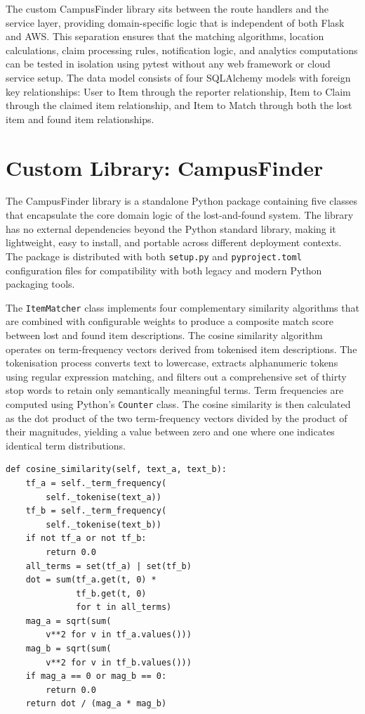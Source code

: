 \documentclass[conference]{IEEEtran}
\begin{document}
The custom CampusFinder library sits between the route handlers and the service layer, providing domain-specific logic that is independent of both Flask and AWS. This separation ensures that the matching algorithms, location calculations, claim processing rules, notification logic, and analytics computations can be tested in isolation using pytest without any web framework or cloud service setup. The data model consists of four SQLAlchemy models with foreign key relationships: User to Item through the reporter relationship, Item to Claim through the claimed item relationship, and Item to Match through both the lost item and found item relationships.

\section{Custom Library: CampusFinder}

The CampusFinder library is a standalone Python package containing five classes that encapsulate the core domain logic of the lost-and-found system. The library has no external dependencies beyond the Python standard library, making it lightweight, easy to install, and portable across different deployment contexts. The package is distributed with both \texttt{setup.py} and \texttt{pyproject.toml} configuration files for compatibility with both legacy and modern Python packaging tools.

The \texttt{ItemMatcher} class implements four complementary similarity algorithms that are combined with configurable weights to produce a composite match score between lost and found item descriptions. The cosine similarity algorithm operates on term-frequency vectors derived from tokenised item descriptions. The tokenisation process converts text to lowercase, extracts alphanumeric tokens using regular expression matching, and filters out a comprehensive set of thirty stop words to retain only semantically meaningful terms. Term frequencies are computed using Python's \texttt{Counter} class. The cosine similarity is then calculated as the dot product of the two term-frequency vectors divided by the product of their magnitudes, yielding a value between zero and one where one indicates identical term distributions.

\begin{lstlisting}[caption={Cosine similarity in the ItemMatcher class}]
def cosine_similarity(self, text_a, text_b):
    tf_a = self._term_frequency(
        self._tokenise(text_a))
    tf_b = self._term_frequency(
        self._tokenise(text_b))
    if not tf_a or not tf_b:
        return 0.0
    all_terms = set(tf_a) | set(tf_b)
    dot = sum(tf_a.get(t, 0) *
              tf_b.get(t, 0)
              for t in all_terms)
    mag_a = sqrt(sum(
        v**2 for v in tf_a.values()))
    mag_b = sqrt(sum(
        v**2 for v in tf_b.values()))
    if mag_a == 0 or mag_b == 0:
        return 0.0
    return dot / (mag_a * mag_b)
\end{lstlisting}
\end{document}
